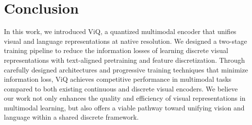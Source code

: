 \section{Conclusion}
\label{sec:conclusion}

In this work, we introduced ViQ, a quantized multimodal encoder that unifies visual and language representations at native resolution. We designed a two-stage training pipeline to reduce the information losses of learning discrete visual representations with text-aligned pretraining and feature discretization. Through carefully designed architectures and progressive training techniques that minimize information loss, ViQ achieves competitive performance in multimodal tasks compared to both existing continuous and discrete visual encoders. We believe our work not only enhances the quality and efficiency of visual representations in multimodal learning, but also offers a viable pathway toward unifying vision and language within a shared discrete framework.
